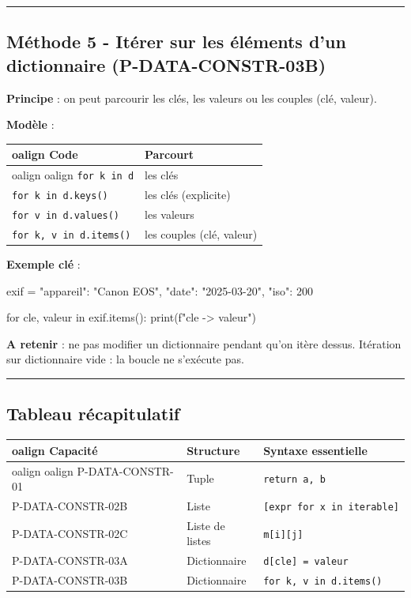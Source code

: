 \begin{center}\rule{0.5\linewidth}{0.5pt}\end{center}

\subsection{Méthode 5 - Itérer sur les éléments d’un dictionnaire (P-DATA-CONSTR-03B)}

\textbf{Principe} : on peut parcourir les clés, les valeurs ou les
couples (clé, valeur).

\textbf{Modèle} :

\begin{longtable}[]{@{}ll@{}}
\toprule
oalign{}
Code & Parcourt \\
\midrule
oalign{}
\endhead
\bottomrule
oalign{}
\endlastfoot
\texttt{for\ k\ in\ d} & les clés \\
\texttt{for\ k\ in\ d.keys()} & les clés (explicite) \\
\texttt{for\ v\ in\ d.values()} & les valeurs \\
\texttt{for\ k,\ v\ in\ d.items()} & les couples (clé, valeur) \\
\end{longtable}

\textbf{Exemple clé} :

\begin{python}
exif = {"appareil": "Canon EOS", "date": "2025-03-20", "iso": 200}

for cle, valeur in exif.items():
    print(f"{cle} -> {valeur}")
\end{python}

\textbf{A retenir} : ne pas modifier un dictionnaire pendant qu'on itère
dessus. Itération sur dictionnaire vide : la boucle ne s'exécute pas.

\begin{center}\rule{0.5\linewidth}{0.5pt}\end{center}

\subsection{Tableau récapitulatif}

\begin{longtable}[]{@{}lll@{}}
\toprule
oalign{}
Capacité & Structure & Syntaxe essentielle \\
\midrule
oalign{}
\endhead
\bottomrule
oalign{}
\endlastfoot
P-DATA-CONSTR-01 & Tuple & \texttt{return\ a,\ b} \\
P-DATA-CONSTR-02B & Liste & \texttt{{[}expr\ for\ x\ in\ iterable{]}} \\
P-DATA-CONSTR-02C & Liste de listes & \texttt{m{[}i{]}{[}j{]}} \\
P-DATA-CONSTR-03A & Dictionnaire & \texttt{d{[}cle{]}\ =\ valeur} \\
P-DATA-CONSTR-03B & Dictionnaire & \texttt{for\ k,\ v\ in\ d.items()} \\
\end{longtable}

